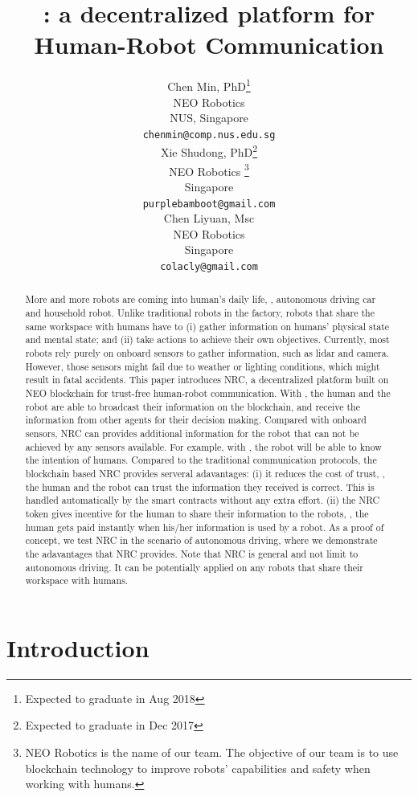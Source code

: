 \documentclass{article}
\title{\nrc: a decentralized platform for Human-Robot Communication}
\author{
  Chen Min, PhD\thanks{Expected to graduate in Aug 2018}\\
  NEO Robotics
  \\
  NUS, Singapore\\
  \texttt{chenmin@comp.nus.edu.sg} \\
  \And
  Xie Shudong, PhD\thanks{Expected to graduate in Dec 2017}\\
  NEO Robotics
  \thanks{NEO Robotics is the name of our team.
      The objective of our team is to use blockchain technology
      to improve robots' capabilities and safety when working 
      with humans.}
  \\
  Singapore\\
  \texttt{purplebamboot@gmail.com} \\
  \And
  Chen Liyuan, Msc\\
  NEO Robotics\\
  Singapore\\
  \texttt{colacly@gmail.com} \\
}
\begin{document}

\maketitle

\begin{abstract}
	
More and more robots are coming into human's daily life,
\eg, autonomous driving car and household robot.
Unlike traditional robots in the factory, robots that share the
same workspace with humans have to (i) gather information on humans'
physical state and mental state;
and (ii) take actions to achieve their own objectives.
Currently, most robots rely purely on onboard sensors to gather 
information, such as lidar and camera.
However, those sensors might fail due to weather or lighting
conditions, which might result in fatal accidents.
This paper introduces NRC, 
a decentralized platform built on NEO blockchain
for trust-free human-robot communication.
With \nrc, the human and the robot are able to broadcast their
information on the blockchain, and receive the 
information from other agents for their decision making.
Compared with onboard sensors, NRC can provides additional 
information for the robot that can not be achieved by 
any sensors available.
For example, with \nrc, the robot will be able to know the 
intention of humans.
Compared to the traditional communication protocols, 
the blockchain based
NRC provides serveral adavantages:
(i) it reduces the cost of trust, \ie, the human and the robot can trust
the information they received is correct. This is handled automatically
by the smart contracts without any extra effort.
(ii) the NRC token gives incentive for the human to share
their information to the robots, \ie, the human gets paid instantly
when his/her information is used by a robot.
As a proof of concept, we test NRC in the scenario of autonomous driving,
where we demonstrate the adavantages that NRC provides.
Note that NRC is general and not limit to autonomous driving. 
It can
be potentially applied on any robots that share their workspace
with humans.
 
\end{abstract}


\section{Introduction}
\end{document}
